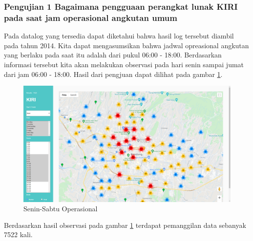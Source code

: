 \subsubsection{Pengujian 1 Bagaimana pengguaan perangkat lunak KIRI pada saat jam operasional angkutan umum }
\label{subsec:pengujian1}
Pada datalog yang tersedia dapat diketahui bahwa hasil log tersebut diambil pada tahun 2014. Kita dapat mengasumsikan bahwa jadwal opreasional angkutan yang berlaku pada saat itu adalah dari pukul 06:00 - 18:00. Berdasarkan informasi tersebut kita akan melakukan observasi pada hari senin sampai jumat dari jam 06:00 - 18:00. Hasil dari pengjuan dapat dilihat pada gambar \ref{fig:operasional}.
  \begin{figure}[H]
	\centering  
	\includegraphics[scale=0.3]{Gambar/pengujian/senin-sabtu-operasional.png}  
	\caption[Senin-Sabtu Operasional]{Senin-Sabtu Operasional} 
	\label{fig:operasional}
\end{figure}

Berdasarkan hasil observasi pada gambar \ref{fig:operasional} terdapat pemanggilan data sebanyak 7522 kali.


